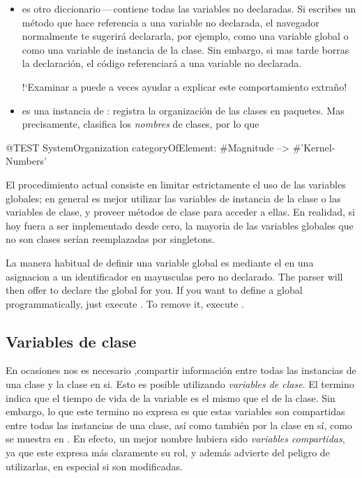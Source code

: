 \documentclass[a4paper,10pt,twoside]{book}
\begin{document}
\begin{itemize}
\item
{} es otro diccionario\,---\,contiene todas las variables no declaradas.
Si escribes un m\'etodo que hace referencia a una variable no declarada, el navegador normalmente
te sugerir\'a declararla, por ejemplo, como una variable global o como una variable de instancia de la clase.
Sin embargo, si mas tarde borras la declaraci\'on, el c\'odigo referenciar\'a a una variable no declarada.

!`Examinar a  puede a veces ayudar a explicar este comportamiento extra\~no!

\item
{} es una instancia de : registra la organizaci\'on de las clases en paquetes.  Mas precisamente, clasifica los \emph{nombres} de clases, por lo que
\end{itemize}

\begin{code}{@TEST}
SystemOrganization categoryOfElement: #Magnitude --> #'Kernel-Numbers'
\end{code}

El procedimiento actual consiste en limitar estrictamente el uso de las variables globales; en general es mejor utilizar las variables de instancia de la clase o las variables de clase, y proveer m\'etodos de clase para acceder a ellas. En realidad, si \pharo hoy fuera a ser implementado desde cero, la mayoria de las variables globales que no son clases ser\'ian reemplazadas por singletons.

La manera habitual de definir una variable global es mediante el  en una asignacion a un identificador en mayusculas pero no declarado. The parser will then offer to declare the global for you.  If you want to define a global programmatically, just execute .  To remove it, execute .


\subsection{Variables de clase}

En ocasiones nos es necesario ,compartir informaci\'on entre todas las instancias de una clase y la clase en si. Esto es posible utilizando \emph{variables de clase}. El termino  indica que el tiempo de vida de la variable es el mismo que el de la clase. Sin embargo, lo que este termino no expresa es que estas variables son compartidas entre todas las instancias de una clase, as\'i como tambi\'en por la clase en s\'i, como se muestra en .
En efecto, un mejor nombre hubiera sido \emph{variables compartidas}, ya que este expresa m\'as claramente su rol, y adem\'as advierte del peligro de utilizarlas, en especial si son modificadas.
\end{document}
